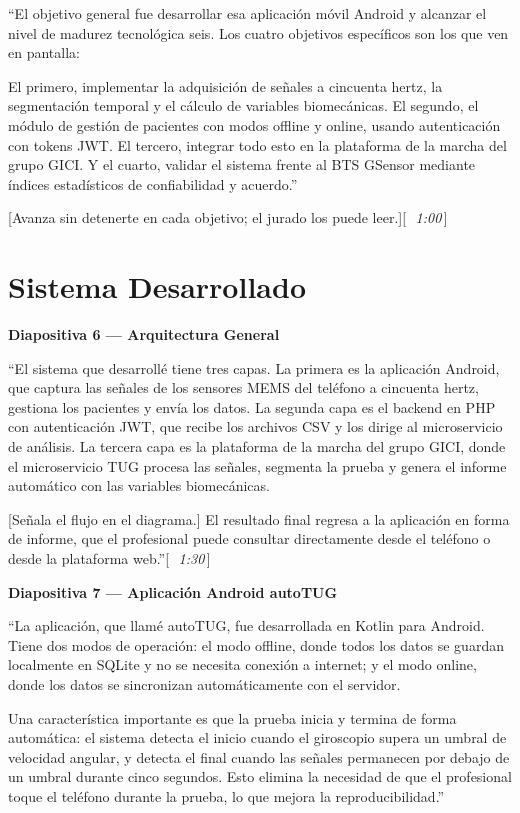 \documentclass[12pt]{article}
\newcommand{\diap}[2]{%
  \begin{slidebox}
    \textbf{\color{slateblue}Diapositiva #1 — #2}
  \end{slidebox}%
}
\newcommand{\tiempo}[1]{\hfill{\small\color{timebox}[\,\textit{~#1}\,]}}
\begin{document}
``El objetivo general fue desarrollar esa aplicación móvil Android y alcanzar el nivel de madurez tecnológica seis. Los cuatro objetivos específicos son los que ven en pantalla:

El primero, implementar la adquisición de señales a cincuenta hertz, la segmentación temporal y el cálculo de variables biomecánicas. El segundo, el módulo de gestión de pacientes con modos offline y online, usando autenticación con tokens JWT. El tercero, integrar todo esto en la plataforma de la marcha del grupo GICI. Y el cuarto, validar el sistema frente al BTS GSensor mediante índices estadísticos de confiabilidad y acuerdo.''

[Avanza sin detenerte en cada objetivo; el jurado los puede leer.]\tiempo{1:00}

\section{Sistema Desarrollado}

\diap{6}{Arquitectura General}

``El sistema que desarrollé tiene tres capas. La primera es la aplicación Android, que captura las señales de los sensores MEMS del teléfono a cincuenta hertz, gestiona los pacientes y envía los datos. La segunda capa es el backend en PHP con autenticación JWT, que recibe los archivos CSV y los dirige al microservicio de análisis. La tercera capa es la plataforma de la marcha del grupo GICI, donde el microservicio TUG procesa las señales, segmenta la prueba y genera el informe automático con las variables biomecánicas.

[Señala el flujo en el diagrama.] El resultado final regresa a la aplicación en forma de informe, que el profesional puede consultar directamente desde el teléfono o desde la plataforma web.''\tiempo{1:30}

\diap{7}{Aplicación Android autoTUG}

``La aplicación, que llamé autoTUG, fue desarrollada en Kotlin para Android. Tiene dos modos de operación: el modo offline, donde todos los datos se guardan localmente en SQLite y no se necesita conexión a internet; y el modo online, donde los datos se sincronizan automáticamente con el servidor.

Una característica importante es que la prueba inicia y termina de forma automática: el sistema detecta el inicio cuando el giroscopio supera un umbral de velocidad angular, y detecta el final cuando las señales permanecen por debajo de un umbral durante cinco segundos. Esto elimina la necesidad de que el profesional toque el teléfono durante la prueba, lo que mejora la reproducibilidad.''
\end{document}
